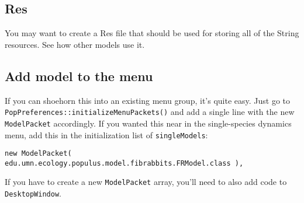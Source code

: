 \documentclass[12pt]{article}
\begin{document}
\subsection{Res}
You may want to create a Res file that should be used for storing all of the String resources.  See how other models use it.

\subsection{Add model to the menu}
If you can shoehorn this into an existing menu group, it's quite easy.  Just go to \texttt{PopPreferences::initializeMenuPackets()} and add a single line with the new \texttt{ModelPacket} accordingly.  If you wanted this near in the single-species dynamics menu, add this in the initialization list of \texttt{singleModels}:

\begin{verbatim}
new ModelPacket( edu.umn.ecology.populus.model.fibrabbits.FRModel.class ),
\end{verbatim}

If you have to create a new \texttt{ModelPacket} array, you'll need to also add code to \texttt{DesktopWindow}.
\end{document}
